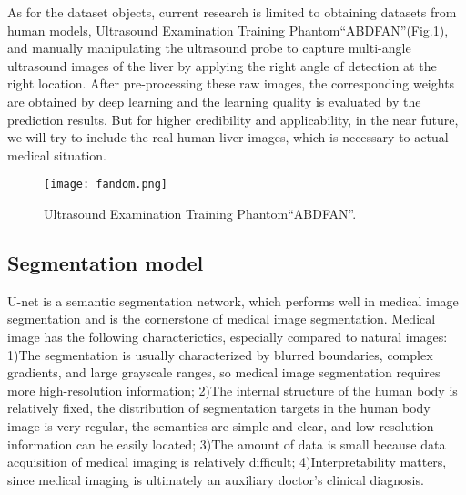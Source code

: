 \documentclass[a4paper]{article}
\begin{document}
As for the dataset objects, current research is limited to obtaining datasets from human models, Ultrasound Examination Training Phantom“ABDFAN”(Fig.1), and manually manipulating the ultrasound probe to capture multi-angle ultrasound images of the liver by applying the right angle of detection at the right location. After pre-processing these raw images, the corresponding weights are obtained by deep learning and the learning quality is evaluated by the prediction results. But for higher credibility and applicability, in the near future, we will try to include the real human liver images, which is necessary to actual medical situation.

\begin{figure}
	\centering
	\texttt{[image: fandom.png]}
	\vspace*{-4mm}
	\caption{Ultrasound Examination Training Phantom“ABDFAN”.}
	\label{fig: fig1}
\end{figure}

\subsection{Segmentation model %
}%

U-net\cite{i1} is a semantic segmentation network, which performs well in medical image segmentation and is the cornerstone of medical image segmentation\cite{r9}. Medical image has the following characterictics, especially compared to natural images: 1)The segmentation is usually characterized by blurred boundaries, complex gradients, and large grayscale ranges, so medical image segmentation requires more high-resolution information; 2)The internal structure of the human body is relatively fixed, the distribution of segmentation targets in the human body image is very regular, the semantics are simple and clear, and low-resolution information can be easily located; 3)The amount of data is small because data acquisition of medical imaging is relatively difficult; 4)Interpretability matters, since medical imaging is ultimately an auxiliary doctor's clinical diagnosis. 
\end{document}

